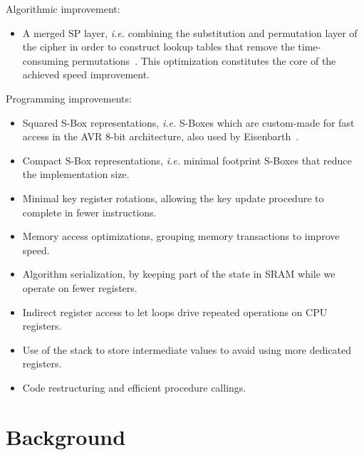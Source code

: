 \documentclass[11pt]{llncs2e} %
\begin{document}
Algorithmic improvement:
\begin{itemize}[nolistsep]
  \item A merged SP layer, \emph{i.e.} combining the substitution and permutation layer of the cipher in order to construct lookup tables that remove the time-consuming permutations~\cite{gong_code,gong2009towards}. This optimization constitutes the core of the achieved speed improvement.
\end{itemize}
Programming improvements:
\begin{itemize}[nolistsep]
  \item Squared S-Box representations, \emph{i.e.} S-Boxes which are custom-made for fast access in the AVR 8-bit architecture, also used by Eisenbarth~\cite{eisenbarth2012compact}.
  \item Compact S-Box representations, \emph{i.e.} minimal footprint S-Boxes that reduce the implementation size.
  \item Minimal key register rotations, allowing the key update procedure to complete in fewer instructions.
  \item Memory access optimizations, grouping memory transactions to improve speed.
  \item Algorithm serialization, by keeping part of the state in SRAM while we operate on fewer registers.
  \item Indirect register access to let loops drive repeated operations on CPU registers.
  \item Use of the stack to store intermediate values to avoid using more dedicated registers.
  \item Code restructuring and efficient procedure callings.
\end{itemize}

\section{Background}
\end{document}
